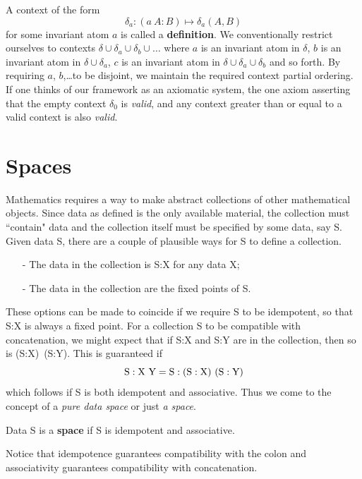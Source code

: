 \documentclass[11pt]{article}
\begin{document}
A context of the form 
\begin{equation}
	\delta_a: (a\ A:B) \mapsto \delta_a(A,B)
\end{equation}
for some invariant atom $a$ is called a {\bf definition}.  We conventionally restrict ourselves to 
contexts $\delta\cup\delta_a\cup\delta_b\cup\dots$ where $a$ is an invariant atom in $\delta$, $b$ is an invariant atom in $\delta\cup\delta_a$, $c$ is an invariant atom in $\delta\cup\delta_a\cup\delta_b$ and so forth.  By requiring $a$, $b$,\dots to be disjoint, we maintain the required context partial ordering.  If one thinks of our framework as an axiomatic system, the one axiom asserting that the empty context $\delta_0$ is {\it valid}, and any context greater than or equal to a valid context is also {\it valid}. 

\section{Spaces}

    Mathematics requires a way to make abstract collections of other mathematical objects.  Since data as defined is the only available material, the collection must 
``contain" data and the collection itself must be specified by some data, say S.  Given data S, there are a couple of plausible ways for S to define a collection.  
\begin{itemize}
\item[-]{The data in the collection is S:X for any data X;}
\item[-]{The data in the collection are the fixed points of S.}
\end{itemize}
These options can be made to coincide if we require S to be idempotent, so that S:X is always a fixed point.  For a collection S to be compatible with concatenation, we might expect that if S:X and S:Y are in the collection, then so is (S:X)\ (S:Y).  This is guaranteed if 
\begin{equation}
{\rm S : X\ Y = S : (S: X)\ (S:Y)}
\end{equation}
which follows if S is both idempotent and associative.  Thus we come to the concept of a {\it pure data space} or just {\it a space}.  
\begin{definition} Data S is a {\bf space} if S is idempotent and associative.
\end{definition}
\noindent Notice that idempotence guarantees compatibility with the colon and associativity guarantees compatibility with concatenation.  
\end{document}

